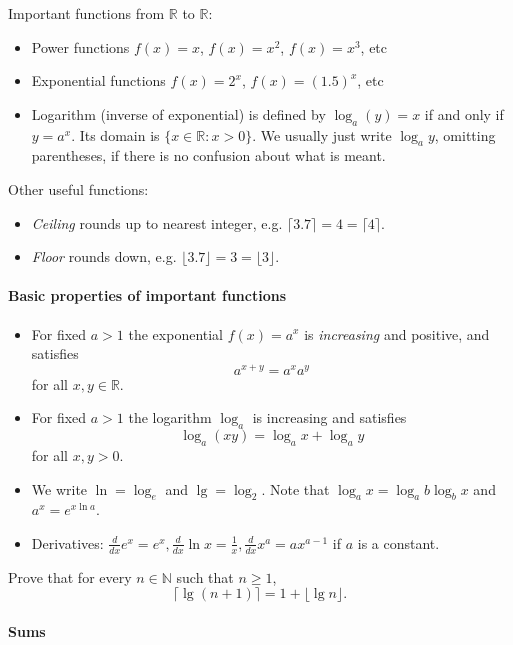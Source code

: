Important functions from $\mathbb{R}$ to $\mathbb{R}$: 
\begin{itemize}
\item Power functions $f(x) = x$, $f(x) = x^2$, $f(x) = x^3$, etc
\item Exponential functions $f(x) = 2^x$, $f(x) = (1.5)^x$, etc
\item Logarithm (inverse of exponential) is defined by $\log_a (y) = x$ if and only if $y = a^x$. Its domain is $\{x\in \mathbb{R} : x > 0\}$. We usually just write $\log_a y$, omitting parentheses, if there is no confusion about what is meant.
\end{itemize}

Other useful functions: 
\begin{itemize}
\item \emph{Ceiling} rounds up to nearest integer, e.g. $\lceil 3.7 \rceil = 4 = \lceil 4 \rceil$. 
\item \emph{Floor} rounds down, e.g. $\lfloor 3.7 \rfloor= 3 = \lfloor 3 \rfloor$.
\end{itemize}



\paragraph{Basic properties of important functions}
\begin{itemize}
\item For fixed $a>1$ the exponential $f(x) = a^x$ is \emph{increasing} and positive, and satisfies $$a^{x+y} = a^x a^y$$ for all $x,y\in \mathbb{R}$. 
\item For fixed $a>1$ the logarithm $\log_a$ is increasing and satisfies 
$$\log_a(xy) = \log_a x + \log_a y$$ for all $x,y>0$.
\item We write $\ln = \log_e$ and $\lg = \log_2$. Note that $\log_a x = \log_a b \log_b x$ and $a^x = e^{x\ln a}$.
\item Derivatives: $\frac{d}{dx} e^x = e^x, \frac{d}{dx} \ln x = \frac{1}{x},  \frac{d}{dx} x^a = ax^{a-1}$ if $a$ is a constant.
\end{itemize}

\begin{Boxample}[4]
Prove that for every $n\in \mathbb{N}$ such that $n\geq 1$,
$$
\lceil \lg (n+1) \rceil = 1 + \lfloor \lg n \rfloor.
$$

\end{Boxample}

\paragraph{Sums}

